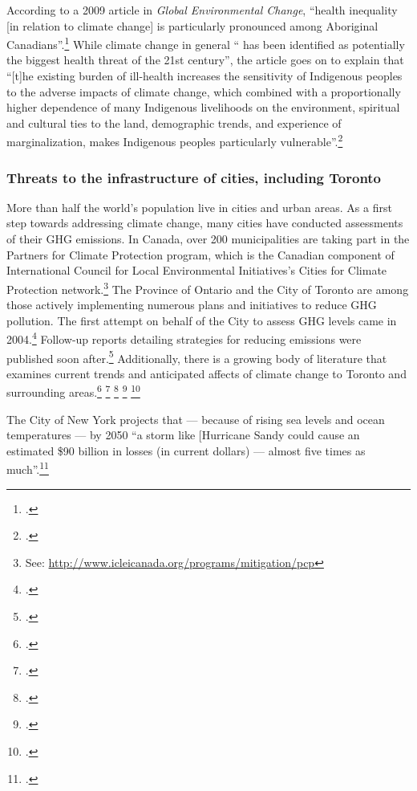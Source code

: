 According to a 2009 article in \emph{Global Environmental Change}, ``health inequality [in relation to climate change] is
particularly pronounced among Aboriginal Canadians''.\footcite[][p. 1]{VulAborig2009}
While climate change in general `` has been identified as potentially the biggest health threat of the 21st century'', the article goes on to explain that ``[t]he existing burden of ill-health increases the sensitivity of Indigenous peoples to the adverse impacts of climate change, which combined with a proportionally higher dependence of many Indigenous livelihoods on the environment, spiritual and cultural ties to the land, demographic trends, and experience of marginalization, makes Indigenous peoples particularly vulnerable''.\footcite[][p. 1]{VulAborig2009}



	\subsubsection{Threats to the infrastructure of cities, including Toronto}



More than half the world's population live in cities and urban areas. 
As a first step towards addressing climate change, many cities have conducted assessments of their GHG emissions. 
In Canada, over 200 municipalities are taking part in the Partners for Climate Protection  program, which is the Canadian component of International Council for Local Environmental Initiatives's Cities for Climate Protection network.\footnote{See: \url{http://www.icleicanada.org/programs/mitigation/pcp}}
The Province of Ontario and the City of Toronto are among those actively implementing numerous plans and initiatives to reduce GHG pollution. 
The first attempt on behalf of the City to assess GHG levels came in 2004.\footcite[][p. IV]{GHGPollutionToronto}
Follow-up reports detailing strategies for reducing emissions were published soon after.\footcite[][]{CCAHealthEquity}
Additionally, there is a growing body of literature that examines current trends and anticipated affects of climate change to Toronto and surrounding areas.\footcite[][]{TorontoEnvOff2007} \footcite[][]{TorontoAheadStorm} \footcite[][]{ScanCCToronto} \footcite[][]{AdaptPrioritiesCanada} \footcite[][]{MacLeodAdaptation}



The City of New York projects that --- because of rising sea levels and ocean temperatures --- by 2050 ``a storm like [Hurricane Sandy could cause an estimated \$90 billion in losses (in current dollars) --- almost five times as much''.\footcite[][Foreward, p. 2]{ResilientNewYork}




